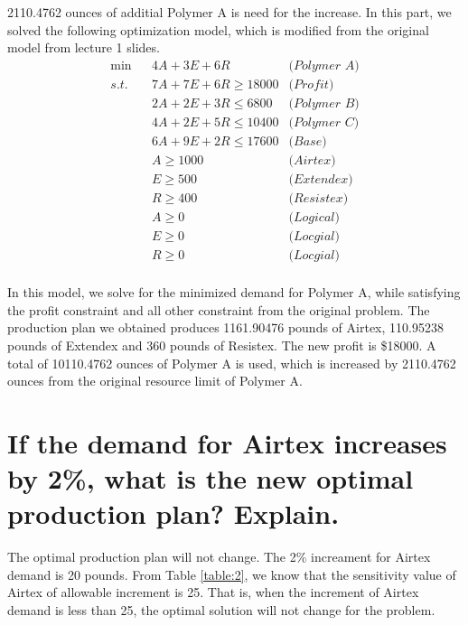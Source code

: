 \documentclass[11pt]{article}
\begin{document}
2110.4762 ounces of additial Polymer A is need for the increase. In this part, we solved the following optimization model, which is modified from the original model from lecture 1 slides. 
\begin{equation}
    \begin{aligned}
    & \min & & 4A + 3E + 6R & \textit{(Polymer A)} &\\
    & s.t. & & 7A + 7E + 6R \geq 18000 &\textit{(Profit)}&\\ 
    &&& 2A + 2E + 3R \leq 6800 &\textit{(Polymer B)} &\\
    &&& 4A + 2E + 5R \leq 10400 &\textit{(Polymer C)} &\\
    &&& 6A + 9E + 2R \leq 17600 &\textit{(Base)} &\\
    &&& A \geq 1000 &\textit{(Airtex)}& \\
    &&& E \geq 500 & \textit{(Extendex)} & \\
    &&& R \geq 400 & \textit{(Resistex)}& \\
    &&& A \geq 0 &\textit{(Logical)}& \\
    &&& E \geq 0 & \textit{(Locgial)} & \\
    &&& R \geq 0 & \textit{(Locgial)} & \\
    \end{aligned}
    \label{eq:1}
\end{equation}

In this model, we solve for the minimized demand for Polymer A, while satisfying the profit constraint and all other constraint from the original problem. The production plan we obtained produces 1161.90476 pounds of Airtex, 110.95238 pounds of Extendex and 360 pounds of Resistex. The new profit is \$18000. A total of 10110.4762 ounces of Polymer A is used, which is increased by 2110.4762 ounces from the original resource limit of Polymer A. 

\section{If the demand for Airtex increases by 2\%, what is the new optimal production plan? Explain.}

The optimal production plan will not change. The 2\% increament for Airtex demand is 20 pounds. From Table \ref{table:2}, we know that the sensitivity value of Airtex of allowable increment is 25. That is, when the increment of Airtex demand is less than 25, the optimal solution will not change for the problem. 

\end{document}
